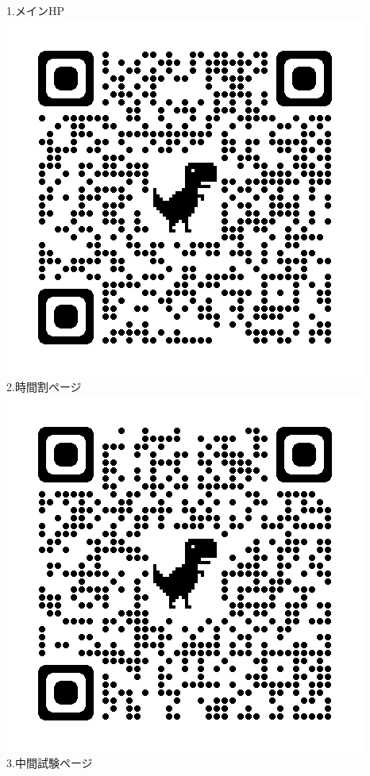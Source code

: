 \documentclass{ltjsarticle}
\begin{document}
1.メインHP\\
\includegraphics{home.png}\\
2.時間割ページ\\
\includegraphics{timetable.png}\\
3.中間試験ページ\\
\end{document}
